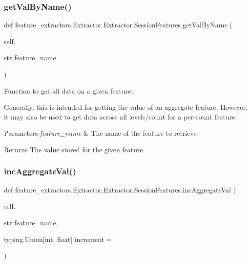 \subsubsection{\texorpdfstring{getValByName()}{getValByName()}}
{\footnotesize\ttfamily def feature\+\_\+extractors.\+Extractor.\+Extractor.\+Session\+Features.\+get\+Val\+By\+Name (\begin{DoxyParamCaption}\item[{}]{self,  }\item[{str}]{feature\+\_\+name }\end{DoxyParamCaption})}



Function to get all data on a given feature. 

Generally, this is intended for getting the value of an aggregate feature. However, it may also be used to get data across all levels/count for a per-\/count feature.


\begin{DoxyParams}{Parameters}
{\em feature\+\_\+name} & The name of the feature to retrieve \\
\hline
\end{DoxyParams}
\begin{DoxyReturn}{Returns}
The value stored for the given feature. 
\end{DoxyReturn}
\mbox{\label{classfeature__extractors_1_1_extractor_1_1_extractor_1_1_session_features_a7d4f6f7bc8639f698f74228a9f14e60a}} 
\subsubsection{\texorpdfstring{incAggregateVal()}{incAggregateVal()}}
{\footnotesize\ttfamily def feature\+\_\+extractors.\+Extractor.\+Extractor.\+Session\+Features.\+inc\+Aggregate\+Val (\begin{DoxyParamCaption}\item[{}]{self,  }\item[{str}]{feature\+\_\+name,  }\item[{typing.\+Union\mbox{[}int, float\mbox{]} }]{increment = {} }\end{DoxyParamCaption})}



